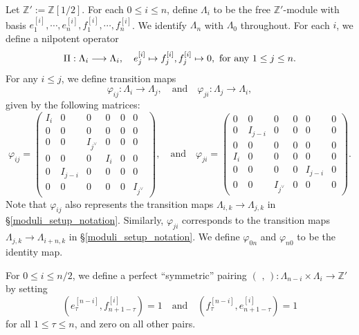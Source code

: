 \documentclass[pdflatex,sn-mathphys-num]{sn-jnl}%
\makeatletter
\theoremstyle{thmstyleone}%
\theoremstyle{thmstyletwo}%
\numberwithin{equation}{subsection}
\theoremstyle{thmstylethree}%
\newcommand{\BZ}{\ensuremath{\mathbb{Z}}\xspace}
\newcommand{\sform}{\ensuremath{(\text{~,~})}\xspace}
\let\shortmapsto\mapsto
\renewcommand{\mapsto}{%
		\ifbool{@display}{\longmapsto}{\shortmapsto}%
	}
\makeatother
\begin{document}
Let $\BZ':=\BZ[1/2]$. 
For each $0\leq i\leq n$, define $\Lambda_i$ to be the free $\BZ'$-module with basis $e^{[i]}_1,\cdots,e^{[i]}_n,f^{[i]}_1,\cdots,f^{[i]}_n$.
We identify $\Lambda_n$ with $\Lambda_0$ throughout.
For each $i$, we define a nilpotent operator
\begin{equation*}
    \Pi:\Lambda_i\longrightarrow \Lambda_i,
    \quad
    e^{[i]}_j\mapsto f^{[i]}_j, f^{[i]}_j\mapsto 0, \text{ for any } 1\leq j\leq n.
\end{equation*}
For any $i\leq j$, we define transition maps
\begin{equation*}
    \varphi_{ij}:\Lambda_i\longrightarrow \Lambda_j,
    \quad\text{and}\quad
    \varphi_{ji}:\Lambda_j\longrightarrow\Lambda_i,
\end{equation*}
given by the following matrices:
\begin{equation*}
    \varphi_{ij}=\left(\begin{matrix}
    I_i&0&0&0&0&0\\
    0&0&0&0&0&0\\
    0&0&I_{j^\vee}&0&0&0\\
    0&0&0&I_i&0&0\\
    0&I_{j-i}&0&0&0&0\\
    0&0&0&0&0&I_{j^\vee}
    \end{matrix}\right),
    \quad\text{and}\quad
    \varphi_{ji}=\left(\begin{matrix}
    0&0&0&0&0&0\\
    0&I_{j-i}&0&0&0&0\\
    0&0&0&0&0&0\\
    I_i&0&0&0&0&0\\
    0&0&0&0&I_{j-i}&0\\
    0&0&I_{j^\vee}&0&0&0
    \end{matrix}\right).
\end{equation*}
Note that $\varphi_{ij}$ also represents the transition maps $\Lambda_{i,k}\rightarrow \Lambda_{j,k}$ in \S \ref{moduli_setup_notation}. Similarly, $\varphi_{ji}$ corresponds to  the transition maps $\Lambda_{j,k}\rightarrow\Lambda_{i+n,k}$ in \S \ref{moduli_setup_notation}.
We define $\varphi_{0n}$ and $\varphi_{n0}$ to be the identity map.

For $0\leq i\leq n/2$, we define a perfect ``symmetric'' pairing $\sform:\Lambda_{n-i}\times \Lambda_{i}\rightarrow \BZ'$ by setting
$$(e^{[n-i]}_\tau, f^{[i]}_{n+1-\tau} )=1\quad\text{and}\quad( f^{[n-i]}_\tau, e^{[i]}_{n+1-\tau} )=1$$
for all $1\leq \tau\leq n$, and zero on all other pairs.
\end{document}
